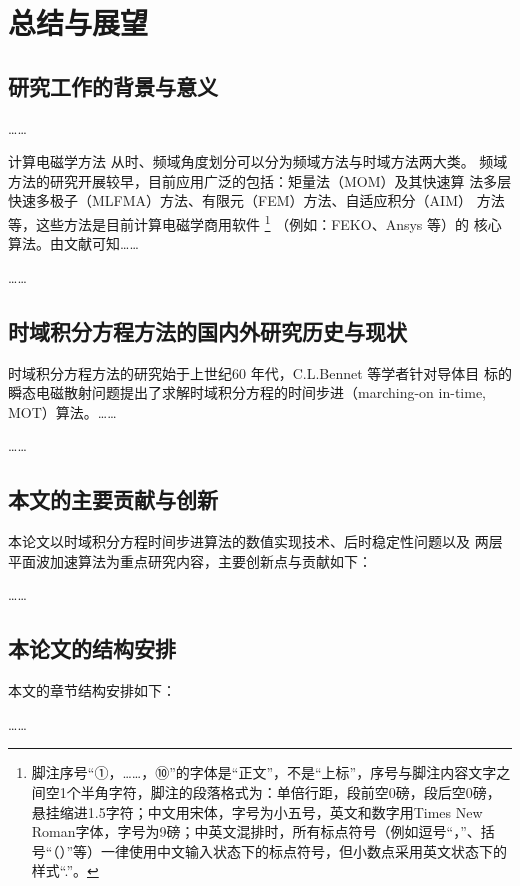 
\chapter{总结与展望}
\section{研究工作的背景与意义}
……

计算电磁学方法
从时、频域角度划分可以分为频域方法与时域方法两大类。
频域方法的研究开展较早，目前应用广泛的包括：矩量法（MOM）及其快速算
法多层快速多极子（MLFMA）方法、有限元（FEM）方法、自适应积分（AIM）
方法等，这些方法是目前计算电磁学商用软件
\footnote{脚注序号“①，……，⑩”的字体是“正文”，不是“上标”，序号与脚注内容文字之间空1个半角字符，脚注的段落格式为：单倍行距，段前空0磅，段后空0磅，悬挂缩进1.5字符；中文用宋体，字号为小五号，英文和数字用Times New Roman字体，字号为9磅；中英文混排时，所有标点符号（例如逗号“，”、括号“（）”等）一律使用中文输入状态下的标点符号，但小数点采用英文状态下的样式“.”。}
（例如：FEKO、Ansys 等）的
核心算法。由文献\cite{feng997he,clerc2010discrete,xiao2012yi}可知……

……
\section{时域积分方程方法的国内外研究历史与现状}
时域积分方程方法的研究始于上世纪60 年代，C.L.Bennet 等学者针对导体目
标的瞬态电磁散射问题提出了求解时域积分方程的时间步进（marching-on in-time,
MOT）算法。……

……
\section{本文的主要贡献与创新}
本论文以时域积分方程时间步进算法的数值实现技术、后时稳定性问题以及
两层平面波加速算法为重点研究内容，主要创新点与贡献如下：

……
\section{本论文的结构安排}
本文的章节结构安排如下：

……
